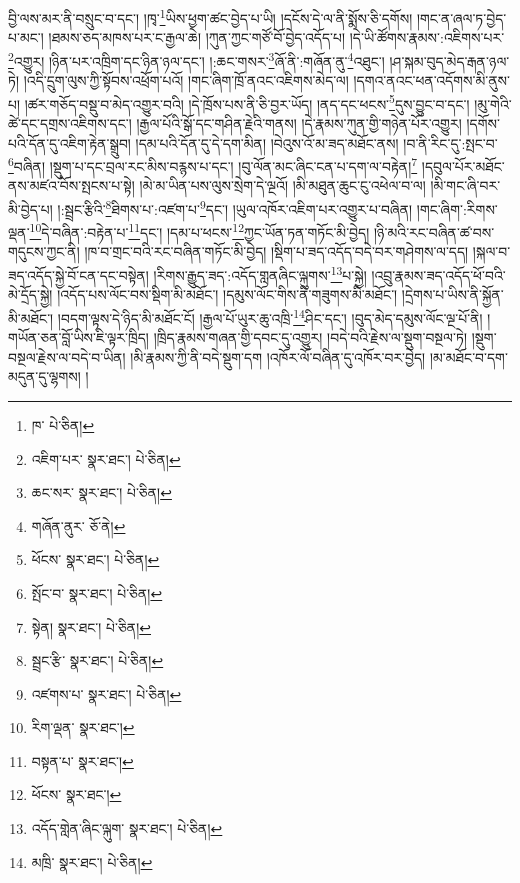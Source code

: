 བྱི་ལས་མར་ནི་བསྲུང་བ་དང་། །ཁྭ་\footnote{ཁ་  པེ་ཅིན། }ཡིས་ཕྱག་ཚང་བྱེད་པ་ཡི། །དངོས་དེ་ལ་ནི་སྨོས་ཅི་དགོས། །གང་ན་ཞལ་ཏ་བྱེད་པ་མང་། །ཐམས་ཅད་མཁས་པར་ང་རྒྱལ་ཆེ། །ཀུན་ཀྱང་གཙོ་བོ་བྱེད་འདོད་པ། །དེ་ཡི་ཚོགས་རྣམས་:འཇིགས་པར་\footnote{འཇིག་པར་  སྣར་ཐང་།  པེ་ཅིན། }འགྱུར། །ཉིན་པར་འཁྲིག་དང་ཉིན་ཉལ་དང་། །:ཆང་གསར་\footnote{ཆང་སར་  སྣར་ཐང་།  པེ་ཅིན། }ཞོ་ནི་:གཞོན་ནུ་\footnote{གཞོན་ནུར་  ཅོ་ནེ། }འཐུང་། །ཤ་སྐམ་བུད་མེད་རྒན་ཉལ་ཏེ། །འདི་དྲུག་ལུས་ཀྱི་སྟོབས་འཕྲོག་པའོ། །གང་ཞིག་ཁྲོ་ནའང་འཇིགས་མེད་ལ། །དགའ་ནའང་ཕན་འདོགས་མི་ནུས་པ། །ཚར་གཅོད་བསྡུ་བ་མེད་འགྱུར་བའི། །དེ་ཁྲོས་པས་ནི་ཅི་བྱར་ཡོད། །ནད་དང་ཕངས་\footnote{ཕོངས་  སྣར་ཐང་།  པེ་ཅིན། }དུས་བྱུང་བ་དང་། །མུ་གེའི་ཚེ་དང་དགྲས་འཇིགས་དང་། །རྒྱལ་པོའི་སྒོ་དང་གཤིན་རྗེའི་གནས། །དེ་རྣམས་ཀུན་གྱི་གཉེན་པོར་འགྱུར། །དགོས་པའི་དོན་དུ་འཇིག་རྟེན་སྒྲུབ། །དམ་པའི་དོན་དུ་དེ་དག་མིན། །བེའུས་འོ་མ་ཟད་མཐོང་ནས། །བ་ནི་རིང་དུ་:སྤང་བ་\footnote{སྤོང་བ་  སྣར་ཐང་།  པེ་ཅིན། }བཞིན། །སྡུག་པ་དང་བྲལ་རང་མིས་བརྙས་པ་དང་། །བུ་ལོན་མང་ཞིང་ངན་པ་དག་ལ་བརྟེན།\footnote{སྟེན།  སྣར་ཐང་།  པེ་ཅིན། } །དབུལ་པོར་མཐོང་ནས་མཛའ་བོས་སྤངས་པ་སྟེ། །མེ་མ་ཡིན་པས་ལུས་སྲེག་དེ་ལྔའོ། །མི་མཐུན་ཆུང་ངུ་འཕེལ་བ་ལ། །མི་གང་ཞི་བར་མི་བྱེད་པ། །:སྦྲང་རྩིའི་\footnote{སྦྲང་རྩི་  སྣར་ཐང་།  པེ་ཅིན། }ཐིགས་པ་:འཛག་པ་\footnote{འཛགས་པ་  སྣར་ཐང་།  པེ་ཅིན། }དང་། །ཡུལ་འཁོར་འཇིག་པར་འགྱུར་པ་བཞིན། །གང་ཞིག་:རིགས་ལྡན་\footnote{རིག་ལྡན་  སྣར་ཐང་། }དེ་བཞིན་:བརྟེན་པ་\footnote{བསྟན་པ་  སྣར་ཐང་། }དང་། །དམ་པ་ཕངས་\footnote{ཕོངས་  སྣར་ཐང་། }ཀྱང་ཡོན་ཏན་གཏོང་མི་བྱེད། །ཉི་མའི་རང་བཞིན་ཚ་བས་གདུངས་ཀྱང་ནི། །ཁ་བ་གྲང་བའི་རང་བཞིན་གཏོང་མི་བྱེད། །སྡིག་པ་ཟད་འདོད་བདེ་བར་གཤེགས་ལ་དད། །སྐལ་བ་ཟད་འདོད་སྐྱེ་བོ་ངན་དང་བསྟེན། །རིགས་རྒྱུད་ཟད་:འདོད་གླནཞིང་ལྐུགས་\footnote{འདོད་གླེན་ཞིང་ལྐུག་  སྣར་ཐང་།  པེ་ཅིན། }པ་སྐྱེ། །འབྲུ་རྣམས་ཟད་འདོད་ཕོ་བའི་མེ་དྲོད་སྐྱེ། །འདོད་པས་ལོང་བས་སྡིག་མི་མཐོང་། །དམུས་ལོང་གིས་ནི་གཟུགས་མི་མཐོང་། །དྲེགས་པ་ཡིས་ནི་སྐྱོན་མི་མཐོང་། །བདག་ལྟས་དེ་ཉིད་མི་མཐོང་ངོ། །རྒྱལ་པོ་ཡུར་ཆུ་འཁྲི་\footnote{མཁྲི་  སྣར་ཐང་།  པེ་ཅིན། }ཤིང་དང་། །བུད་མེད་དམུས་ལོང་ལྔ་པོ་ནི། །གཡོན་ཅན་བློ་ཡིས་ཇི་ལྟར་ཁྲིད། །ཁྲིད་རྣམས་གཞན་གྱི་དབང་དུ་འགྱུར། །བདེ་བའི་རྗེས་ལ་སྡུག་བསྔལ་ཏེ། །སྡུག་བསྔལ་རྗེས་ལ་བདེ་བ་ཡིན། །མི་རྣམས་ཀྱི་ནི་བདེ་སྡུག་དག །འཁོར་ལོ་བཞིན་དུ་འཁོར་བར་བྱེད། །མ་མཐོང་བ་དག་མདུན་དུ་ལྷགས། །
